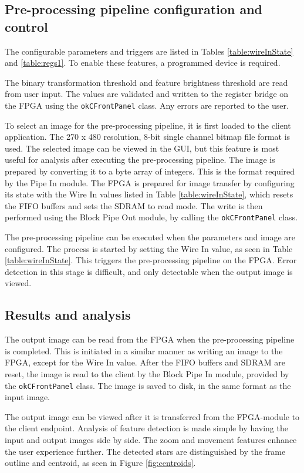 \documentclass[12pt]{report}
\begin{document}
\subsection{Pre-processing pipeline configuration and control}
The configurable parameters and triggers are listed in Tables \ref*{table:wireInState} and \ref*{table:regs1}. To enable these features, a programmed device is required. \citep{stpp}
\par
The binary transformation threshold and feature brightness threshold are read from user input. The values are validated and written to the register bridge on the FPGA using the \texttt{okCFrontPanel} class. Any errors are reported to the user. \citep{stpp}
\par
To select an image for the pre-processing pipeline, it is first loaded to the client application. The 270 x 480 resolution, 8-bit single channel bitmap file format is used. The selected image can be viewed in the GUI, but this feature is most useful for analysis after executing the pre-processing pipeline. The image is prepared by converting it to a byte array of integers. This is the format required by the Pipe In module. The FPGA is prepared for image transfer by configuring its state with the Wire In values listed in Table \ref*{table:wireInState}, which resets the FIFO buffers and sets the SDRAM to read mode.
The write is then performed using the Block Pipe Out module, by calling the \texttt{okCFrontPanel} class. \citep{stpp}
\par
The pre-processing pipeline can be executed when the parameters and image are configured. The 
process is started by setting the Wire In value, as seen in Table \ref{table:wireInState}. This triggers the pre-processing pipeline on the FPGA. Error detection in this stage is difficult, and only detectable when the output image is viewed. \citep{stpp}

\subsection{Results and analysis}
The output image can be read from the FPGA when the pre-processing pipeline is completed. This is initiated in a similar manner as writing an image to the FPGA, except for the Wire In value. After the FIFO buffers and SDRAM are reset, the image is read to the client by the Block Pipe In module, provided by the \texttt{okCFrontPanel} class. The image is saved to disk, in the same format as the input image. \citep{stpp}
\par
The output image can be viewed after it is transferred from the FPGA-module to the client endpoint. Analysis of feature detection is made simple by having the input and output images side by side. The zoom and movement features enhance the user experience further. The detected stars are distinguished by the frame outline and centroid, as seen in Figure \ref*{fig:centroids}. \citep{stpp}
\end{document}
